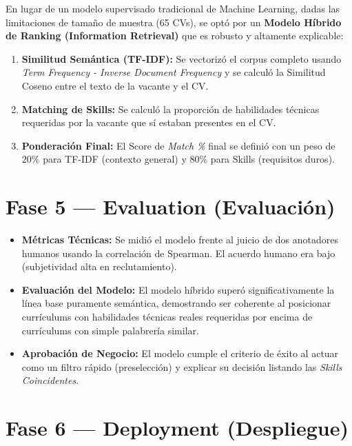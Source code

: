 \documentclass[11pt]{article}
\begin{document}
En lugar de un modelo supervisado tradicional de Machine Learning, dadas las limitaciones de tamaño de muestra (65 CVs), se optó por un \textbf{Modelo Híbrido de Ranking (Information Retrieval)} que es robusto y altamente explicable:

\begin{enumerate}[label=\textbf{\arabic*.}]
    \item \textbf{Similitud Semántica (TF-IDF):} Se vectorizó el corpus completo usando \textit{Term Frequency - Inverse Document Frequency} y se calculó la Similitud Coseno entre el texto de la vacante y el CV.
    \item \textbf{Matching de Skills:} Se calculó la proporción de habilidades técnicas requeridas por la vacante que sí estaban presentes en el CV.
    \item \textbf{Ponderación Final:} El Score de \textit{Match \%} final se definió con un peso de $20\%$ para TF-IDF (contexto general) y $80\%$ para Skills (requisitos duros).
\end{enumerate}

\section*{Fase 5 — Evaluation (Evaluación)}

\begin{itemize}
    \item \textbf{Métricas Técnicas:} Se midió el modelo frente al juicio de dos anotadores humanos usando la correlación de Spearman. El acuerdo humano era bajo (subjetividad alta en reclutamiento). 
    \item \textbf{Evaluación del Modelo:} El modelo híbrido superó significativamente la línea base puramente semántica, demostrando ser coherente al posicionar currículums con habilidades técnicas reales requeridas por encima de currículums con simple palabrería similar.
    \item \textbf{Aprobación de Negocio:} El modelo cumple el criterio de éxito al actuar como un filtro rápido (preselección) y explicar su decisión listando las \textit{Skills Coincidentes}.
\end{itemize}

\section*{Fase 6 — Deployment (Despliegue)}
\end{document}
